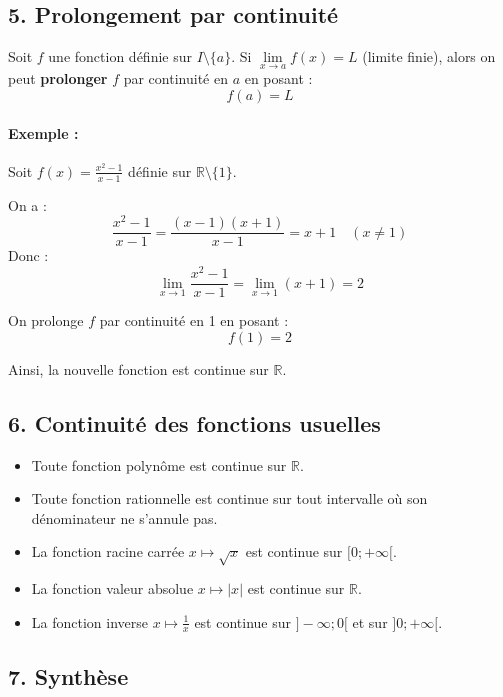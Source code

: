 \documentclass[12pt,a4paper]{article}
\begin{document}
\subsection*{\color{myred}5. Prolongement par continuité}

Soit \( f \) une fonction définie sur \( I \setminus \{a\} \). Si \( \lim\limits_{x \to a} f(x) = L \) (limite finie), alors on peut \textbf{prolonger} \( f \) par continuité en \( a \) en posant :
\[
f(a) = L
\]

\paragraph{Exemple :}
Soit \( f(x) = \frac{x^2 - 1}{x - 1} \) définie sur \( \mathbb{R} \setminus \{1\} \).

On a :
\[
\frac{x^2 - 1}{x - 1} = \frac{(x-1)(x+1)}{x-1} = x+1 \quad (x \neq 1)
\]
Donc :
\[
\lim_{x \to 1} \frac{x^2 - 1}{x - 1} = \lim_{x \to 1} (x+1) = 2
\]

On prolonge \( f \) par continuité en 1 en posant :
\[
f(1) = 2
\]

Ainsi, la nouvelle fonction est continue sur \( \mathbb{R} \).

\subsection*{\color{myred}6. Continuité des fonctions usuelles}

\begin{tcolorbox}[colback=gray!5!white, colframe=black!75!black]
\begin{itemize}
    \item Toute fonction polynôme est continue sur \( \mathbb{R} \).
    \item Toute fonction rationnelle est continue sur tout intervalle où son dénominateur ne s'annule pas.
    \item La fonction racine carrée \( x \mapsto \sqrt{x} \) est continue sur \( [0; +\infty[ \).
    \item La fonction valeur absolue \( x \mapsto |x| \) est continue sur \( \mathbb{R} \).
    \item La fonction inverse \( x \mapsto \frac{1}{x} \) est continue sur \( ]-\infty; 0[ \) et sur \( ]0; +\infty[ \).
\end{itemize}
\end{tcolorbox}

\subsection*{\color{myred}7. Synthèse}
\end{document}
